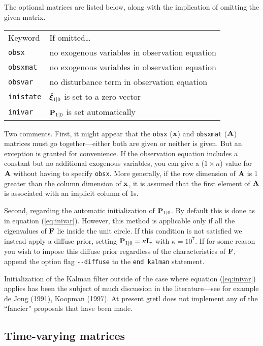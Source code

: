 \documentclass[a4paper]{article}
\newcommand{\obsx}{\ensuremath\mathbf{x}}
\newcommand{\obsxmat}{\ensuremath\mathbf{A}}
\newcommand{\statevec}{\ensuremath\mathbf{\bm \xi}}
\newcommand{\statemat}{\ensuremath\mathbf{F}}
\newcommand{\statevar}{\ensuremath\mathbf{P}}
\begin{document}
The optional matrices are listed below, along with the implication
of omitting the given matrix.

\begin{center}
\begin{tabular}{ll}
Keyword & If omitted\dots \\ [6pt]
\texttt{obsx} & no exogenous variables in observation equation\\
\texttt{obsxmat} & no exogenous variables in observation equation\\
\texttt{obsvar} & no disturbance term in observation equation\\
\texttt{inistate} & $\hat{\statevec}_{1|0}$ is set to a zero vector\\
\texttt{inivar} & $\statevar_{1|0}$ is set automatically\\
\end{tabular}
\end{center}

Two comments.  First, it might appear that the \texttt{obsx}
($\obsx$) and \texttt{obsxmat} ($\obsxmat$) matrices must go
together---either both are given or neither is given.  But an
exception is granted for convenience.  If the observation equation
includes a constant but no additional exogenous variables, you can
give a ($1 \times n$) value for $\obsxmat$ without having to specify
\texttt{obsx}.  More generally, if the row dimension of $\obsxmat$ is
1 greater than the column dimension of $\obsx$, it is assumed that the
first element of $\obsxmat$ is associated with an implicit column of
1s.

Second, regarding the automatic initialization of $\statevar_{1|0}$.
By default this is done as in equation (\ref{eq:inivar}).  However,
this method is applicable only if all the eigenvalues of $\statemat$ lie
inside the unit circle.  If this condition is not satisfied we instead
apply a diffuse prior, setting $\statevar_{1|0} = \kappa \mathbf{I}_r$
with $\kappa = 10^7$.  If for some reason you wish to impose this
diffuse prior regardless of the characteristics of $\statemat$, append
the option flag \verb|--diffuse| to the \texttt{end kalman}
statement.

Initialization of the Kalman filter outside of the case where equation
(\ref{eq:inivar}) applies has been the subject of much discussion in
the literature---see for example de Jong (1991), Koopman (1997).  At
present gretl does not implement any of the ``fancier'' proposals that
have been made.


\subsection{Time-varying matrices}
\end{document}
